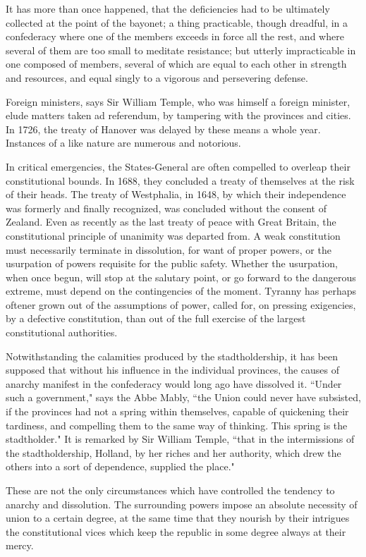 It has more than once happened, that the deficiencies had to be ultimately collected at the point of the bayonet; a thing practicable, though dreadful, in a confederacy where one of the members exceeds in force all the rest, and where several of them are too small to meditate resistance; but utterly impracticable in one composed of members, several of which are equal to each other in strength and resources, and equal singly to a vigorous and persevering defense.

Foreign ministers, says Sir William Temple, who was himself a foreign minister, elude matters taken ad referendum, by tampering with the provinces and cities. In 1726, the treaty of Hanover was delayed by these means a whole year. Instances of a like nature are numerous and notorious.

In critical emergencies, the States-General are often compelled to overleap their constitutional bounds. In 1688, they concluded a treaty of themselves at the risk of their heads. The treaty of Westphalia, in 1648, by which their independence was formerly and finally recognized, was concluded without the consent of Zealand. Even as recently as the last treaty of peace with Great Britain, the constitutional principle of unanimity was departed from. A weak constitution must necessarily terminate in dissolution, for want of proper powers, or the usurpation of powers requisite for the public safety. Whether the usurpation, when once begun, will stop at the salutary point, or go forward to the dangerous extreme, must depend on the contingencies of the moment. Tyranny has perhaps oftener grown out of the assumptions of power, called for, on pressing exigencies, by a defective constitution, than out of the full exercise of the largest constitutional authorities.

Notwithstanding the calamities produced by the stadtholdership, it has been supposed that without his influence in the individual provinces, the causes of anarchy manifest in the confederacy would long ago have dissolved it. ``Under such a government," says the Abbe Mably, ``the Union could never have subsisted, if the provinces had not a spring within themselves, capable of quickening their tardiness, and compelling them to the same way of thinking. This spring is the stadtholder." It is remarked by Sir William Temple, ``that in the intermissions of the stadtholdership, Holland, by her riches and her authority, which drew the others into a sort of dependence, supplied the place."

These are not the only circumstances which have controlled the tendency to anarchy and dissolution. The surrounding powers impose an absolute necessity of union to a certain degree, at the same time that they nourish by their intrigues the constitutional vices which keep the republic in some degree always at their mercy.

